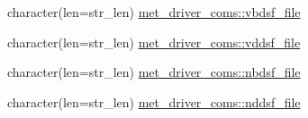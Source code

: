\begin{DoxyCompactItemize}
character(len=str\+\_\+len) \hyperlink{namespacemet__driver__coms_a5077cb97033c5b4e610edbe044ce890e}{met\+\_\+driver\+\_\+coms\+::vbdsf\+\_\+file}
\item 
character(len=str\+\_\+len) \hyperlink{namespacemet__driver__coms_aeb25a3a4ea0b2fd649a7bab6b694d8be}{met\+\_\+driver\+\_\+coms\+::vddsf\+\_\+file}
\item 
character(len=str\+\_\+len) \hyperlink{namespacemet__driver__coms_a8f3d2674e75157c654a61aa253ba5ac7}{met\+\_\+driver\+\_\+coms\+::nbdsf\+\_\+file}
\item 
character(len=str\+\_\+len) \hyperlink{namespacemet__driver__coms_a8adb3cddd748a6ba29fb75dd69ca54c7}{met\+\_\+driver\+\_\+coms\+::nddsf\+\_\+file}
\end{DoxyCompactItemize}
